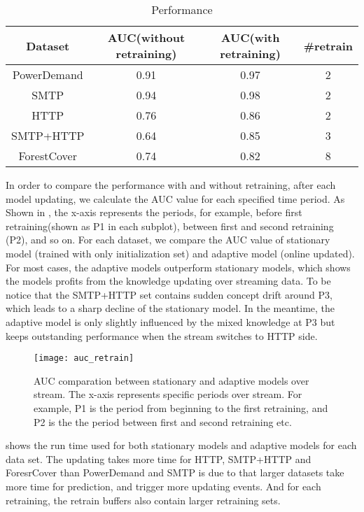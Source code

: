 \begin{table}[h] 
\caption{Performance} 
\centering      
\begin{tabular}{c | c | c | c}  
\hline  
Dataset & AUC(without retraining) & AUC(with retraining) & \#retrain \\ 
\hline 
PowerDemand & 0.91 & 0.97 & 2  \\  
\hline 
SMTP & 0.94 &  0.98 &  2 \\ 
\hline 
HTTP & 0.76 &  0.86 &  2 \\ 
\hline
SMTP+HTTP & 0.64 & 0.85 & 3 \\
\hline 
ForestCover &0.74&0.82 & 8\\   
\hline    
\end{tabular}
\label{tab:performance}  
\end{table} 
In order to compare the performance with and without retraining, after each model updating, we calculate the AUC value for each specified time period. As Shown in , the x-axis represents the periods, for example, before first retraining(shown as P1 in each subplot), between first and second retraining (P2), and so on. For each dataset, we compare the AUC value of stationary model (trained with only initialization set) and adaptive model (online updated). For most cases, the adaptive models outperform stationary models, which shows the models profits from the knowledge updating over streaming data. To be notice that the SMTP+HTTP set contains sudden concept drift around P3, which leads to a sharp decline of the stationary model. In the meantime, the adaptive model is only slightly influenced by the mixed knowledge at P3 but keeps outstanding performance when the stream switches to HTTP side.\\
\begin{figure}[h]
\centering
\texttt{[image: auc\_retrain]}
\caption[AUC comparation between stationary and adaptive models over stream]{AUC comparation between stationary and adaptive models over stream. The x-axis represents specific periods over stream. For example, P1 is the period from beginning to the first retraining, and P2 is the the period between first and second retraining etc.}
\label{fig:auc_retrain}
\end{figure}

 shows the run time used for both stationary models and adaptive models for each data set. The updating takes more time for HTTP, SMTP+HTTP and ForesrCover than PowerDemand and SMTP is due to that larger datasets take more time for prediction, and trigger more updating events. And for each retraining, the retrain buffers also contain larger retraining sets.



